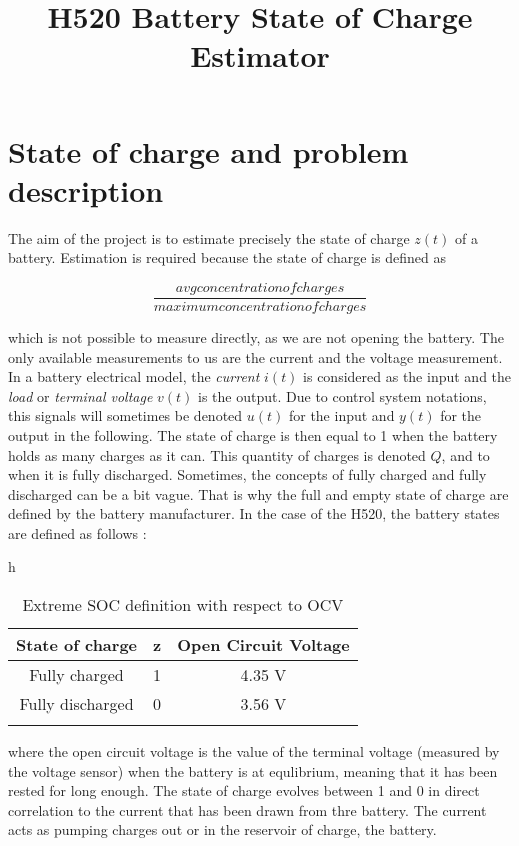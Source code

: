 \documentclass{article}
\title{H520 Battery State of Charge Estimator}
\begin{document}
 

\section{State of charge and problem description}

The aim of the project is to estimate precisely the state of charge $z(t)$ of a battery. Estimation is required because the state of charge is defined as \

\begin{equation}
\frac{avg concentration of charges}{maximum concentration of charges}
\end{equation}

which is not possible to measure directly, as we are not opening the battery. The only available measurements to us are the current and the voltage measurement. In a battery electrical model, the \textit{current} $i(t)$ is considered as the input and the \textit{load} or \textit{terminal voltage} $v(t)$ is the output. Due to control system notations, this signals will sometimes be denoted $u(t)$ for the input and $y(t)$ for the output in the following.
The state of charge is then equal to 1 when the battery holds as many charges as it can. This quantity of charges is denoted $Q$, and to when it is fully discharged. Sometimes, the concepts of fully charged and fully discharged can be a bit vague. That is why the full and empty state of charge are defined by the battery manufacturer. In the case of the H520, the battery states are defined as follows :

\begin{table}{h}
\centering
\begin{tabular}{c|c|c}
    State of charge & z & Open Circuit Voltage \\
    \hline
    Fully charged & 1 & 4.35 V \\
    \hline
    Fully discharged & 0 & 3.56 V \\
\label{maxSOCOCV}
\end{tabular}
\caption{Extreme SOC definition with respect to OCV}
\end{table}

where the open circuit voltage is the value of the terminal voltage (measured by the voltage sensor) when the battery is at equlibrium, meaning that it has been rested for long enough. The state of charge evolves between 1 and 0 in direct correlation to the current that has been drawn from thre battery. The current acts as pumping charges out or in the reservoir of charge, the battery. 
\end{document}
